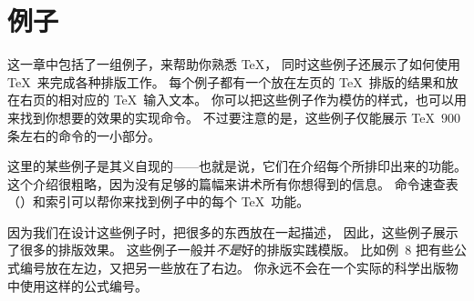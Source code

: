 

\chapter{例子}


这一章中包括了一组例子，来帮助你熟悉 \TeX ，
同时这些例子还展示了如何使用 \TeX\ 来完成各种排版工作。
每个例子都有一个放在左页的 \TeX\ 排版的结果和放在右页的相对应的 \TeX\ 输入文本。
你可以把这些例子作为模仿的样式，也可以用来找到你想要的效果的实现命令。
不过要注意的是，这些例子仅能展示 \TeX\ $900$ 条左右的命令的一小部分。

这里的某些例子是其义自现的——也就是说，它们在介绍每个所排印出来的功能。
这个介绍很粗略，因为没有足够的篇幅来讲术所有你想得到的信息。
命令速查表（）和索引可以帮你来找到例子中的每个 \TeX\ 功能。

因为我们在设计这些例子时，把很多的东西放在一起描述，
因此，这些例子展示了很多的排版效果。
这些例子一般并\emph{不是}好的排版实践模版。
比如例~8 把有些公式编号放在左边，又把另一些放在了右边。
你永远不会在一个实际的科学出版物中使用这样的公式编号。

